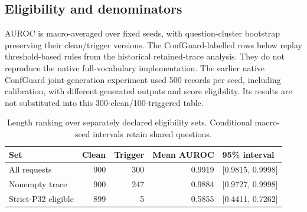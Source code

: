 \documentclass[journal,onecolumn]{IEEEtran}
\begin{document}
\subsection{Eligibility and denominators}
AUROC is macro-averaged over fixed seeds, with question-cluster bootstrap preserving their clean/trigger versions.
The ConfGuard-labelled rows below replay threshold-based rules from the historical retained-trace analysis. They do not reproduce the native full-vocabulary implementation. The earlier native ConfGuard joint-generation experiment used 500 records per seed, including calibration, with different generated outputs and score eligibility. Its results are not substituted into this 300-clean/100-triggered table.
\begin{table}[H]
\centering
\caption{Length ranking over separately declared eligibility sets. Conditional macro-seed intervals retain shared questions.}\label{tab:auroc}
\footnotesize
\setlength{\tabcolsep}{4pt}
\begin{tabular}{@{}lrrrl@{}}
\toprule
Set & Clean & Trigger & Mean AUROC & 95\% interval\\
\midrule
All requests & 900 & 300 & 0.9919 & [0.9815, 0.9998]\\
Nonempty trace & 900 & 247 & 0.9884 & [0.9727, 0.9998]\\
Strict-P32 eligible & 899 & 5 & 0.5855 & [0.4411, 0.7262]\\
\bottomrule
\end{tabular}
\end{table}
\end{document}
